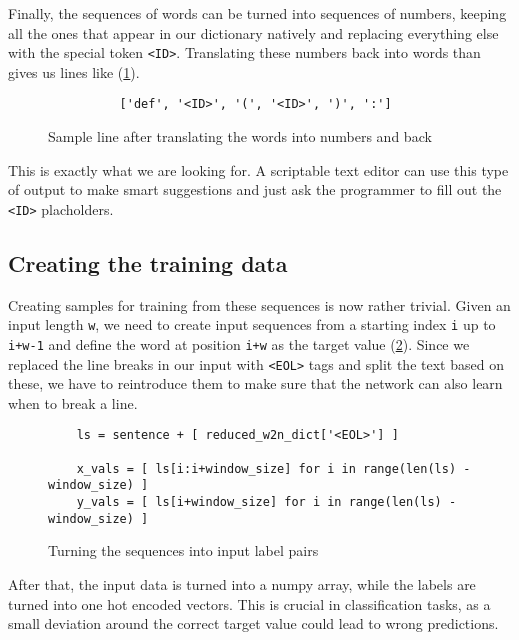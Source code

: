     Finally, the sequences of words can be turned into sequences of numbers, keeping all the ones that appear in
    our dictionary natively and replacing everything else with the special token \verb+<ID>+. Translating
    these numbers back into words than gives us lines like (\ref{fig:goodsample}).

    \begin{figure}[htpb]
      \centering
      \begin{verbatim}
          ['def', '<ID>', '(', '<ID>', ')', ':'] \end{verbatim}
      \caption{Sample line after translating the words into numbers and back}
      \label{fig:goodsample}
    \end{figure}

    This is exactly what we are looking for. A scriptable text editor
    can use this type of output to make smart suggestions and just ask the programmer to fill out the \verb+<ID>+ placholders.

    \subsection{Creating the training data}
    \label{sub:creating_the_training_data}
    
      Creating samples for training from these sequences is now rather trivial. Given an input length \verb+w+, we need
      to create input sequences from a starting index \verb+i+ up to \verb|i+w-1| and define the word at position
      \verb|i+w| as the target value (\ref{fig:tosamples}). Since we replaced the line breaks in our input with
      \verb+<EOL>+ tags and split the text based on these, we have to reintroduce them to make sure that
      the network can also learn when to break a line.

      \begin{figure}[htpb]
        \centering
        \begin{lstlisting}
    ls = sentence + [ reduced_w2n_dict['<EOL>'] ]
    
    x_vals = [ ls[i:i+window_size] for i in range(len(ls) - window_size) ]
    y_vals = [ ls[i+window_size] for i in range(len(ls) - window_size) ] \end{lstlisting}
        \caption{Turning the sequences into input label pairs}
        \label{fig:tosamples}
      \end{figure}

      After that, the input data is turned into a numpy array, while the labels are turned into one hot encoded vectors.
      This is crucial in classification tasks, as a small deviation around the correct target value could lead to
      wrong predictions.
